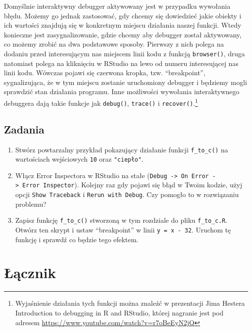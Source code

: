\documentclass[paper=6in:9in,pagesize=pdftex,headinclude=on,footinclude=on,10pt]{scrbook}
\providecommand{\tightlist}{%
  \setlength{\itemsep}{0pt}\setlength{\parskip}{0pt}}
\begin{document}
Domyślnie interaktywny debugger aktywowany jest w przypadku wywołania błędu.
Możemy go jednak zastosować, gdy chcemy się dowiedzieć jakie obiekty i ich wartości znajdują się w konkretnym miejscu działania naszej funkcji.
Wtedy konieczne jest zasygnalizowanie, gdzie chcemy aby debugger został aktywowany, co możemy zrobić na dwa podstawowe sposoby.
Pierwszy z nich polega na dodaniu przed interesującym nas miejscem linii kodu z funkcją \texttt{browser()}, druga natomiast polega na kliknięciu w RStudio na lewo od numeru interesującej nas linii kodu.
Wówczas pojawi się czerwona kropka, tzw. ``breakpoint'', sygnalizująca, że w tym miejscu zostanie uruchomiony debugger i będziemy mogli sprawdzić stan działania programu.
Inne możliwości wywołania interaktywnego debuggera dają takie funkcje jak \texttt{debug()}, \texttt{trace()} i \texttt{recover()}.\footnote{Wyjaśnienie działania tych funkcji można znaleźć w prezentacji Jima Hestera Introduction to debugging in R and RStudio, której nagranie jest pod adresem \url{https://www.youtube.com/watch?v=r7oBeEyN2jQ}}

\hypertarget{zadania}{%
\section{Zadania}\label{zadania}}

\begin{enumerate}
\def\labelenumi{\arabic{enumi}.}
\tightlist
\item
  Stwórz powtarzalny przykład pokazujący działanie funkcji \texttt{f\_to\_c()} na wartościach wejściowych \texttt{10} oraz \texttt{"ciepło"}.
\item
  Włącz Error Inspectora w RStudio na stałe (\texttt{Debug\ -\textgreater{}\ On\ Error\ -\textgreater{}\ Error\ Inspector}).
  Kolejny raz gdy pojawi się błąd w Twoim kodzie, użyj opcji \texttt{Show\ Traceback} i \texttt{Rerun\ with\ Debug}.
  Czy pomogło to w rozwiązaniu problemu?
\item
  Zapisz funkcję \texttt{f\_to\_c()} stworzoną w tym rozdziale do pliku \texttt{f\_to\_c.R}.
  Otwórz ten skrypt i ustaw ``breakpoint'' w linii \texttt{y\ =\ x\ -\ 32}.
  Uruchom tę funkcję i sprawdź co będzie tego efektem.
\end{enumerate}

\hypertarget{lacznik}{%
\chapter{Łącznik}\label{lacznik}}
\end{document}
